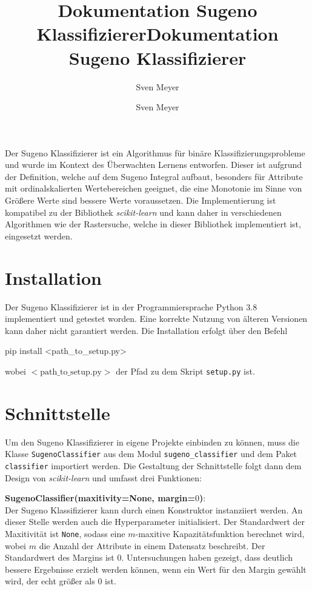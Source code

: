 \documentclass[12pt, a4paper]{article}
\title{Dokumentation Sugeno Klassifizierer}
\author{
	Sven Meyer
}
\begin{document}
\title{Dokumentation Sugeno Klassifizierer}
\author{Sven Meyer}
\maketitle

\tableofcontents

\newpage
Der Sugeno Klassifizierer ist ein Algorithmus für binäre Klassifizierungsprobleme und wurde im Kontext des Überwachten Lernens entworfen. Dieser ist aufgrund der Definition, welche auf dem Sugeno Integral aufbaut, besonders für Attribute mit ordinalskalierten Wertebereichen geeignet, die eine Monotonie im Sinne von \glqq Größere Werte sind bessere Werte\grqq{} voraussetzen. Die Implementierung ist kompatibel zu der Bibliothek \textit{scikit-learn} und kann daher in verschiedenen Algorithmen wie der Rastersuche, welche in dieser Bibliothek implementiert ist, eingesetzt werden.

\section{Installation}
\label{sec:documentation:installation}
Der Sugeno Klassifizierer ist in der Programmiersprache Python $3.8$ implementiert und getestet worden. Eine korrekte Nutzung von älteren Versionen kann daher nicht garantiert werden. Die Installation erfolgt über den Befehl 

\begin{python}
	pip install <path_to_setup.py>
\end{python}

wobei $<\text{path\_to\_setup.py}>$ der Pfad zu dem Skript \texttt{setup.py} ist.

\section{Schnittstelle}
\label{sec:documentation:interface}
Um den Sugeno Klassifizierer in eigene Projekte einbinden zu können, muss die Klasse \texttt{SugenoClassifier} aus dem Modul \texttt{sugeno\_classifier} und dem Paket \texttt{classifier} importiert werden. Die Gestaltung der Schnittstelle folgt dann dem Design von \textit{scikit-learn} und umfasst drei Funktionen:

\textbf{SugenoClassifier(maxitivity=None, margin=$0$)}: \\
Der Sugeno Klassifizierer kann durch einen Konstruktor instanziiert werden. An dieser Stelle werden auch die Hyperparameter initialisiert. Der Standardwert der Maxitivität ist \texttt{None}, sodass eine $m$-maxitive Kapazitätsfunktion berechnet wird, wobei $m$ die Anzahl der Attribute in einem Datensatz beschreibt. Der Standardwert des Margins ist $0$. Untersuchungen haben gezeigt, dass deutlich bessere Ergebnisse erzielt werden können, wenn ein Wert für den Margin gewählt wird, der echt größer als $0$ ist.
\end{document}
